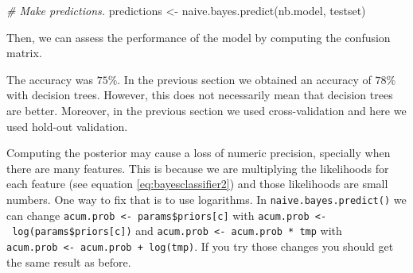 \documentclass[
  11pt,
]{krantz}
\makeatletter
\newenvironment{Shaded}{\begin{snugshade}}{\end{snugshade}}
\newcommand{\CommentTok}[1]{\textcolor[rgb]{0.37,0.37,0.37}{\textit{#1}}}
\newcommand{\FunctionTok}[1]{\textcolor[rgb]{0,0,0}{#1}}
\newcommand{\NormalTok}[1]{#1}
\newcommand{\OtherTok}[1]{\textcolor[rgb]{0.37,0.37,0.37}{#1}}
\newcommand{\SpecialCharTok}[1]{\textcolor[rgb]{0,0,0}{#1}}
\newcommand{\StringTok}[1]{\textcolor[rgb]{0.5,0.5,0.5}{#1}}
\newenvironment{kframe}{%
\medskip{}
\setlength{\fboxsep}{.8em}
 \def\at@end@of@kframe{}%
 \ifinner\ifhmode%
  \def\at@end@of@kframe{\end{minipage}}%
  \begin{minipage}{\columnwidth}%
 \fi\fi%
 \def\FrameCommand##1{\hskip\@totalleftmargin \hskip-\fboxsep
 \colorbox{shadecolor}{##1}\hskip-\fboxsep
     \hskip-\linewidth \hskip-\@totalleftmargin \hskip\columnwidth}%
 \MakeFramed {\advance\hsize-\width
   \@totalleftmargin\z@ \linewidth\hsize
   \@setminipage}}%
 {\par\unskip\endMakeFramed%
 \at@end@of@kframe}
\newenvironment{rmdblock}[1]
  {
  \begin{itemize}
  \renewcommand{\labelitemi}{
    \raisebox{-.7\height}[0pt][0pt]{
      {\setkeys{Gin}{width=3em,keepaspectratio}\texttt{[image: images/icons/\#1]}}
    }
  }
  \setlength{\fboxsep}{1em}
  \begin{kframe}
  \item
  }
  {
  \end{kframe}
  \end{itemize}
  }
\newenvironment{rmdcaution}
  {\begin{rmdblock}{caution}}
  {\end{rmdblock}}
\makeatother
\begin{document}
\begin{Shaded}
\begin{Highlighting}[]
\CommentTok{\# Make predictions.}
\NormalTok{predictions }\OtherTok{\textless{}{-}} \FunctionTok{naive.bayes.predict}\NormalTok{(nb.model, testset)}
\end{Highlighting}
\end{Shaded}

Then, we can assess the performance of the model by computing the confusion matrix.

\begin{Shaded}
\end{Shaded}

The accuracy was \(75\%\). In the previous section we obtained an accuracy of \(78\%\) with decision trees. However, this does not necessarily mean that decision trees are better. Moreover, in the previous section we used cross-validation and here we used hold-out validation.

\begin{rmdcaution}
Computing the posterior may cause a loss of numeric precision, specially when there are many features. This is because we are multiplying the likelihoods for each feature (see equation \eqref{eq:bayesclassifier2}) and those likelihoods are small numbers. One way to fix that is to use logarithms. In \texttt{naive.bayes.predict()} we can change \texttt{acum.prob\ \textless{}-\ params\$priors{[}c{]}} with \texttt{acum.prob\ \textless{}-\ log(params\$priors{[}c{]})} and \texttt{acum.prob\ \textless{}-\ acum.prob\ *\ tmp} with \texttt{acum.prob\ \textless{}-\ acum.prob\ +\ log(tmp)}. If you try those changes you should get the same result as before.
\end{rmdcaution}
\end{document}

